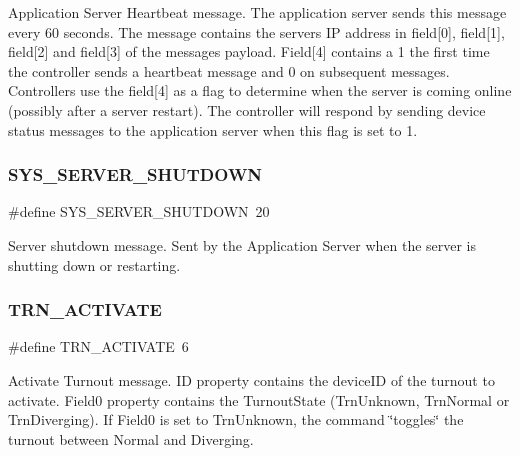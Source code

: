 Application Server Heartbeat message. The application server sends this message every 60 seconds. The message contains the server\textquotesingle{}s IP address in field\mbox{[}0\mbox{]}, field\mbox{[}1\mbox{]}, field\mbox{[}2\mbox{]} and field\mbox{[}3\mbox{]} of the message\textquotesingle{}s payload. Field\mbox{[}4\mbox{]} contains a 1 the first time the controller sends a heartbeat message and 0 on subsequent messages. Controllers use the field\mbox{[}4\mbox{]} as a flag to determine when the server is coming online (possibly after a server restart). The controller will respond by sending device status messages to the application server when this flag is set to 1. \mbox{\label{group___u_d_p_message_i_d_ga3021efce231e9a711d6f498630327086}} 
\subsubsection{\texorpdfstring{S\+Y\+S\+\_\+\+S\+E\+R\+V\+E\+R\+\_\+\+S\+H\+U\+T\+D\+O\+WN}{SYS\_SERVER\_SHUTDOWN}}
{\footnotesize\ttfamily \#define S\+Y\+S\+\_\+\+S\+E\+R\+V\+E\+R\+\_\+\+S\+H\+U\+T\+D\+O\+WN~20}

Server shutdown message. Sent by the Application Server when the server is shutting down or restarting. \mbox{\label{group___u_d_p_message_i_d_gab5a0eacfbf0cfab134534d10890d5c25}} 
\subsubsection{\texorpdfstring{T\+R\+N\+\_\+\+A\+C\+T\+I\+V\+A\+TE}{TRN\_ACTIVATE}}
{\footnotesize\ttfamily \#define T\+R\+N\+\_\+\+A\+C\+T\+I\+V\+A\+TE~6}

Activate Turnout message. ID property contains the device\+ID of the turnout to activate. Field0 property contains the Turnout\+State (Trn\+Unknown, Trn\+Normal or Trn\+Diverging). If Field0 is set to Trn\+Unknown, the command \char`\"{}toggles\char`\"{} the turnout between Normal and Diverging. \mbox{\label{group___u_d_p_message_i_d_ga44d53121d88631ed14d77f8b6a405816}} 

